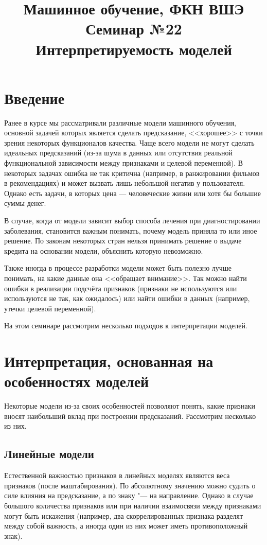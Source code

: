 \documentclass[12pt,a4paper]{article}
\title{Машинное обучение, ФКН ВШЭ\\Семинар №22\\Интерпретируемость моделей}
\begin{document}
\author{}
\date{}
\maketitle

\section{Введение}

Ранее в курсе мы рассматривали различные модели машинного обучения, основной задачей которых является сделать предсказание, <<хорошее>> с точки зрения некоторых функционалов качества. Чаще всего модели не могут сделать идеальных предсказаний (из-за шума в данных или отсутствия реальной функциональной зависимости между признаками и целевой переменной). В некоторых задачах ошибка не так критична (например, в ранжировании фильмов в рекомендациях) и может вызвать лишь небольшой негатив у пользователя. Однако есть задачи, в которых цена --- человеческие жизни или хотя бы большие суммы денег.

В случае, когда от модели зависит выбор способа лечения при диагностировании заболевания, становится важным понимать, почему модель приняла то или иное решение. По законам некоторых стран нельзя принимать решение о выдаче кредита на основании модели, объяснить которую невозможно.

Также иногда в процессе разработки модели может быть полезно лучше понимать, на какие данные она <<обращает внимание>>. Так можно найти ошибки в реализации подсчёта признаков (признаки не используются или используются не так, как ожидалось) или найти ошибки в данных (например, утечки целевой переменной).

На этом семинаре рассмотрим несколько подходов к интерпретации моделей.

\section{Интерпретация, основанная на особенностях моделей}

Некоторые модели из-за своих особенностей позволяют понять, какие признаки вносят наибольший вклад при построении предсказаний. Рассмотрим несколько из них.

\subsection{Линейные модели}
\par Естественной важностью признаков в линейных моделях являются веса признаков (после маштабирования). По абсолютному значению можно судить о силе влияния на предсказание, а по знаку "--- на направление. Однако в случае большого количества признаков или при наличии взаимосвязи между признаками могут быть искажения (например, два скоррелированных признака разделят между собой важность, а иногда один из них может иметь противоположный знак).
\end{document}
